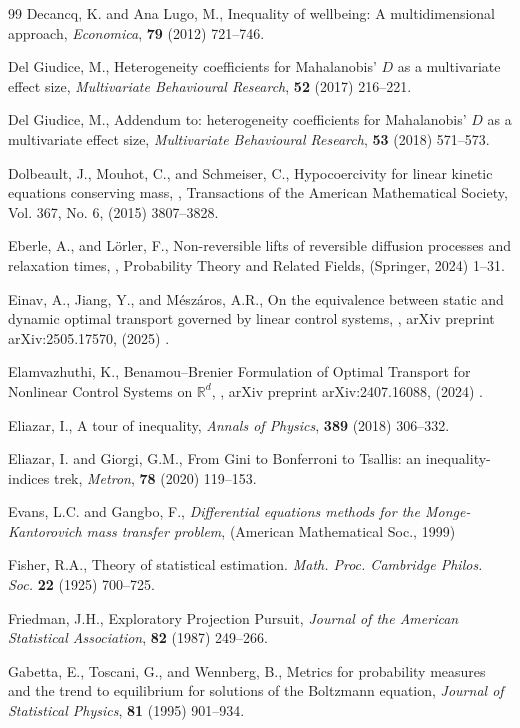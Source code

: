 \documentclass{article}
\begin{document}
\begin{thebibliography}{99}
Decancq, K. and Ana Lugo, M., Inequality of wellbeing: A multidimensional approach, \textit{Economica}, \textbf{79}  (2012) 721--746.

Del Giudice, M., Heterogeneity coefficients for Mahalanobis' $D$ as a multivariate effect size, \textit{Multivariate Behavioural Research}, \textbf{52}  (2017) 216--221.

Del Giudice, M., Addendum to: heterogeneity coefficients for Mahalanobis' $D$ as a multivariate effect size,  \textit{Multivariate Behavioural Research}, \textbf{53}  (2018) 571--573.

Dolbeault, J., Mouhot, C., and Schmeiser, C., Hypocoercivity for linear kinetic equations conserving mass,  , Transactions of the American Mathematical Society, Vol. 367, No. 6, (2015) 3807--3828.

Eberle, A., and Lörler, F., Non-reversible lifts of reversible diffusion processes and relaxation times,  , Probability Theory and Related Fields, (Springer, 2024) 1--31.

Einav, A., Jiang, Y., and Mészáros, A.R., On the equivalence between static and dynamic optimal transport governed by linear control systems,  , arXiv preprint arXiv:2505.17570, (2025) .

Elamvazhuthi, K., Benamou--Brenier Formulation of Optimal Transport for Nonlinear Control Systems on $\mathbb{R}^d$,  , arXiv preprint arXiv:2407.16088, (2024) .

Eliazar, I.,  A tour of inequality, \textit{Annals of Physics}, \textbf{389}  (2018) 306--332.

Eliazar, I. and Giorgi, G.M.,  From Gini to Bonferroni to Tsallis: an inequality-indices trek, \textit{Metron}, \textbf{78}  (2020) 119--153.

Evans, L.C. and Gangbo, F.,
  \emph{Differential equations methods for the {M}onge-{K}antorovich mass transfer problem},
  (American Mathematical Soc.,   1999)

Fisher, R.A., Theory of statistical estimation. \emph{Math. Proc. Cambridge Philos. Soc.} \textbf{22} (1925) 700--725.

Friedman, J.H.,  Exploratory Projection Pursuit, \emph{Journal of the American Statistical Association}, \textbf{82} (1987) 249--266.

Gabetta, E., Toscani, G., and Wennberg, B., Metrics for probability measures and the trend to equilibrium for solutions of the Boltzmann equation, \textit{Journal of Statistical Physics}, \textbf{81}  (1995) 901--934.


\end{thebibliography}
\end{document}
